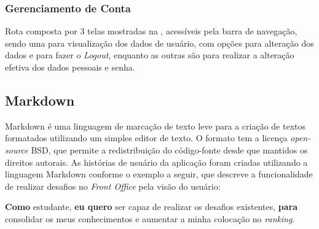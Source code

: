 \subsubsection{Gerenciamento de Conta}

Rota composta por 3 telas mostradas na , acessíveis pela barra de navegação, sendo uma para visualização dos dados de usuário, com opções para alteração dos dados e para fazer o \textit{Logout}, enquanto as outras são para realizar a alteração efetiva dos dados pessoais e senha.


\subsection{Markdown}
\label{hus}

Markdown \cite{markdown} é uma linguagem de marcação de texto leve para a criação de textos formatados utilizando um simples editor de texto. O formato tem a licença \textit{open-source} BSD, que permite a redistribuição do código-fonte desde que mantidos os direitos autorais. As histórias de usuário da aplicação foram criadas utilizando a linguagem Markdown conforme o exemplo a seguir, que descreve a funcionalidade de realizar desafios no \textit{Front Office} pela visão do usuário:

\textbf{Como} estudante, 
\textbf{eu quero} ser capaz de realizar os desafios existentes, 
\textbf{para} consolidar os meus conhecimentos e aumentar a minha colocação no \textit{ranking}.


